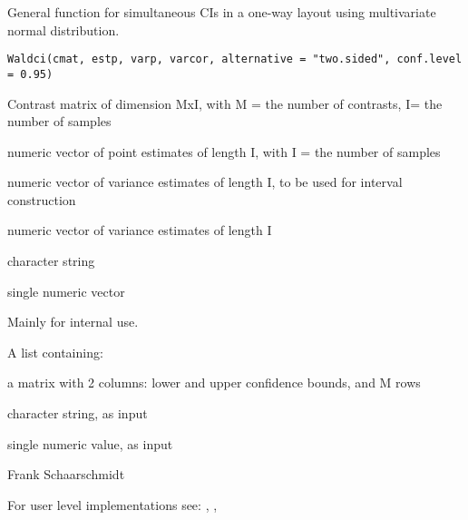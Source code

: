 \begin{Description}\relax
General function for simultaneous CIs in a one-way layout using multivariate normal distribution.
\end{Description}
\begin{Usage}
\begin{verbatim}
Waldci(cmat, estp, varp, varcor, alternative = "two.sided", conf.level = 0.95)
\end{verbatim}
\end{Usage}
\begin{Arguments}
\begin{ldescription}
\item[\code{cmat}] Contrast matrix of dimension MxI, with M = the number of contrasts, I= the number of samples 
\item[\code{estp}] numeric vector of point estimates of length I, with I = the number of samples
\item[\code{varp}] numeric vector of variance estimates of length I, to be used for interval construction 
\item[\code{varcor}] numeric vector of variance estimates of length I 
\item[\code{alternative}] character string 
\item[\code{conf.level}] single numeric vector 
\end{ldescription}
\end{Arguments}
\begin{Details}\relax
Mainly for internal use.
\end{Details}
\begin{Value}
A list containing:
\begin{ldescription}
\item[\code{conf.int }] a matrix with 2 columns: lower and upper confidence bounds, and M rows
\item[\code{alternative }] character string, as input
\item[\code{conf.level}] single numeric value, as input
\end{ldescription}
\end{Value}
\begin{Author}\relax
Frank Schaarschmidt
\end{Author}
\begin{SeeAlso}\relax
For user level implementations see: 
, 
,
\end{SeeAlso}

